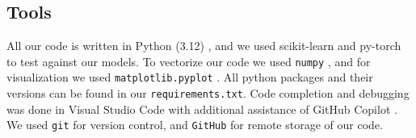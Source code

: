 \subsection{Tools}\label{subsec:tools}

All our code is written in Python (3.12) \cite{Python},  and we used scikit-learn \cite{scikit-learn} and py-torch to test against our models. To vectorize our code we used \verb|numpy| \cite{Numpy}, and for visualization we used \verb|matplotlib.pyplot| \cite{Matplotlib}. All python packages and their versions can be found in our \verb|requirements.txt|. Code completion and debugging was done in Visual Studio Code \cite{VSCode} with additional assistance of GitHub Copilot \cite{Copilot}. We used \verb|git| \cite{Git} for version control, and \verb|GitHub| \cite{GitHub} for remote storage of our code.
